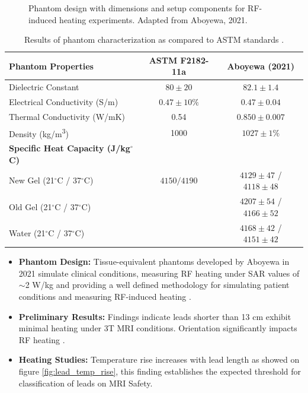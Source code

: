 \documentclass[final]{article}
\begin{document}
\begin{multicols}{3}
\begin{figure}[H]
    \centering
    
    \caption{Phantom design with dimensions and setup components for RF-induced heating experiments. Adapted from Aboyewa, 2021.\cite{aboyewa2021}}
    \label{fig:phantom_design}
\end{figure}

\begin{table}[H]
    \centering
    \renewcommand{\arraystretch}{1.1} %
    \setlength{\tabcolsep}{5pt} %
    \begin{tabular}{|l|c|c|}
        \hline
        \textbf{Phantom Properties} & \textbf{ASTM F2182-11a} & \textbf{Aboyewa (2021)} \\
        \hline
        Dielectric Constant & $80 \pm 20$ & $82.1 \pm 1.4$ \\
        Electrical Conductivity (S/m) & $0.47 \pm 10\%$ & $0.47 \pm 0.04$ \\
        Thermal Conductivity (W/mK) & 0.54 & $0.850 \pm 0.007$ \\
        Density (kg/m\textsuperscript{3}) & 1000 & $1027 \pm 1\%$ \\
        \hline
        \textbf{Specific Heat Capacity (J/kg$^\circ$C)} & & \\
        New Gel (21$^\circ$C / 37$^\circ$C) & $4150 / 4190$ & $4129 \pm 47$ / $4118 \pm 48$ \\
        Old Gel (21$^\circ$C / 37$^\circ$C) & & $4207 \pm 54$ / $4166 \pm 52$ \\
        Water (21$^\circ$C / 37$^\circ$C) &  & $4168 \pm 42$ / $4151 \pm 42$ \\
        \hline
    \end{tabular}
    \caption{Results of phantom characterization as compared to ASTM standards \cite{aboyewa2021}.}
    \label{tab:phantom_characterization}
\end{table}

\begin{itemize}
    \item \textbf{Phantom Design:} Tissue-equivalent phantoms developed by Aboyewa in 2021 simulate clinical conditions, measuring RF heating under SAR values of $\sim$2 W/kg and providing a well defined methodology for simulating patient conditions and measuring RF-induced heating \cite{aboyewa2021}.
    \item \textbf{Preliminary Results:} Findings indicate leads shorter than 13 cm exhibit minimal heating under 3T MRI conditions. Orientation significantly impacts RF heating \cite{aboyewa2021}.
    \item \textbf{Heating Studies:} Temperature rise increases with lead length as showed on figure \ref{fig:lead_temp_rise}, this finding establishes the expected threshold for classification of leads on MRI Safety.
\end{itemize}



\end{multicols}
\end{document}
